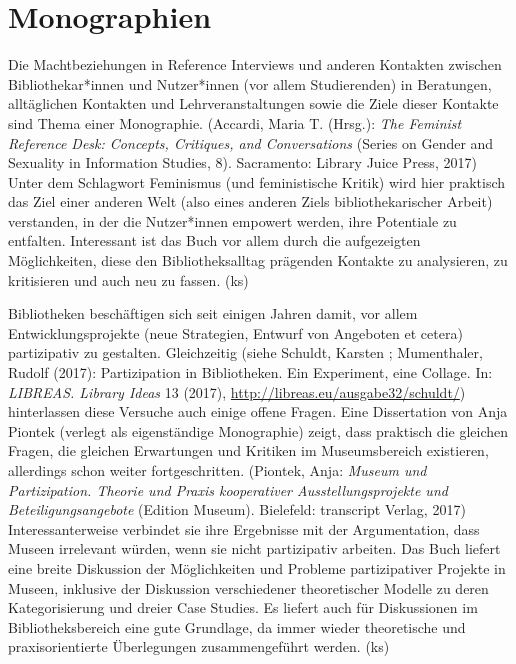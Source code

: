 \documentclass[a4paper,
fontsize=11pt,
oneside,
numbers=noperiodatend,
parskip=half-,
bibliography=totoc,
final
]{scrartcl}
\begin{document}
\hypertarget{monographien}{%
\section{Monographien}\label{monographien}}

Die Machtbeziehungen in Reference Interviews und anderen Kontakten
zwischen Bibliothekar*innen und Nutzer*innen (vor allem Studierenden) in
Beratungen, alltäglichen Kontakten und Lehrveranstaltungen sowie die
Ziele dieser Kontakte sind Thema einer Monographie. (Accardi, Maria T.
(Hrsg.): \emph{The Feminist Reference Desk: Concepts, Critiques, and
Conversations} (Series on Gender and Sexuality in Information Studies,
8). Sacramento: Library Juice Press, 2017) Unter dem Schlagwort
Feminismus (und feministische Kritik) wird hier praktisch das Ziel einer
anderen Welt (also eines anderen Ziels bibliothekarischer Arbeit)
verstanden, in der die Nutzer*innen empowert werden, ihre Potentiale zu
entfalten. Interessant ist das Buch vor allem durch die aufgezeigten
Möglichkeiten, diese den Bibliotheksalltag prägenden Kontakte zu
analysieren, zu kritisieren und auch neu zu fassen. (ks)

Bibliotheken beschäftigen sich seit einigen Jahren damit, vor allem
Entwicklungsprojekte (neue Strategien, Entwurf von Angeboten et cetera)
partizipativ zu gestalten. Gleichzeitig (siehe Schuldt, Karsten ;
Mumenthaler, Rudolf (2017): Partizipation in Bibliotheken. Ein
Experiment, eine Collage. In: \emph{LIBREAS. Library Ideas} 13 (2017),
\url{http://libreas.eu/ausgabe32/schuldt/}) hinterlassen diese Versuche
auch einige offene Fragen. Eine Dissertation von Anja Piontek (verlegt
als eigenständige Monographie) zeigt, dass praktisch die gleichen
Fragen, die gleichen Erwartungen und Kritiken im Museumsbereich
existieren, allerdings schon weiter fortgeschritten. (Piontek, Anja:
\emph{Museum und Partizipation. Theorie und Praxis kooperativer
Ausstellungsprojekte und Beteiligungsangebote} (Edition Museum).
Bielefeld: transcript Verlag, 2017) Interessanterweise verbindet sie
ihre Ergebnisse mit der Argumentation, dass Museen irrelevant würden,
wenn sie nicht partizipativ arbeiten. Das Buch liefert eine breite
Diskussion der Möglichkeiten und Probleme partizipativer Projekte in
Museen, inklusive der Diskussion verschiedener theoretischer Modelle zu
deren Kategorisierung und dreier Case Studies. Es liefert auch für
Diskussionen im Bibliotheksbereich eine gute Grundlage, da immer wieder
theoretische und praxisorientierte Überlegungen zusammengeführt werden.
(ks)
\end{document}
